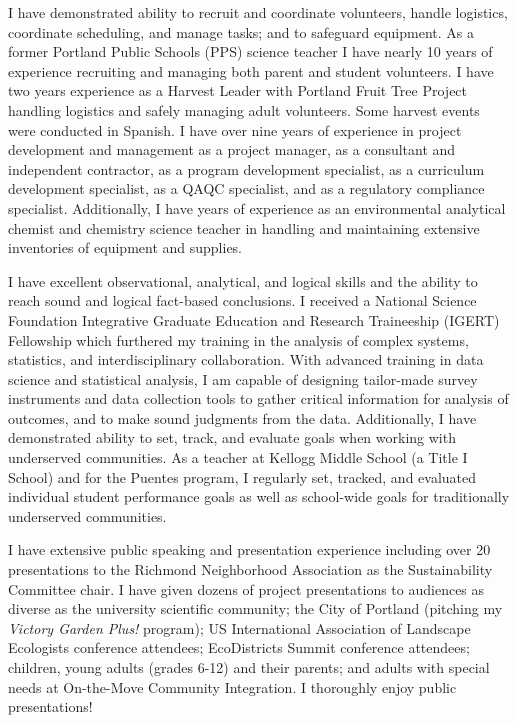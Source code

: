 \documentclass[11 pt,letterpaper]{moderncv}        %
\begin{document}
I have demonstrated ability to recruit and coordinate volunteers, handle logistics, coordinate scheduling, and manage tasks; and to safeguard equipment. As a former Portland Public Schools (PPS) science teacher I have nearly 10 years of experience recruiting and managing both parent and student volunteers. I have two years experience as a Harvest Leader with Portland Fruit Tree Project handling logistics and safely managing adult volunteers. Some harvest events were conducted in Spanish. I have over nine years of experience in project development and management as a project manager, as a consultant and independent contractor, as a program development specialist, as a curriculum development specialist, as a QAQC specialist, and as a regulatory compliance specialist. Additionally, I have years of experience as an environmental analytical chemist and chemistry science teacher in handling and maintaining extensive inventories of equipment and supplies.
 
I have excellent observational, analytical, and logical skills and the ability to reach sound and logical fact-based conclusions. I received a National Science Foundation Integrative Graduate Education and Research Traineeship (IGERT) Fellowship which furthered my training in the analysis of complex systems, statistics, and interdisciplinary collaboration. With advanced training in data science and statistical analysis, I am capable of designing tailor-made survey instruments and data collection tools to gather critical information for analysis of outcomes, and to make sound judgments from the data. Additionally, I have demonstrated ability to set, track, and evaluate goals when working with underserved communities. As a teacher at Kellogg Middle School (a Title I School) and for the Puentes program, I regularly set, tracked, and evaluated individual student performance goals as well as school-wide goals for traditionally underserved communities.

I have extensive public speaking and presentation experience including over 20 presentations to the Richmond Neighborhood Association as the Sustainability Committee chair. I have given dozens of project presentations to audiences as diverse as the university scientific community; the City of Portland (pitching my \textit{Victory Garden Plus!} program); US International Association of Landscape Ecologists conference attendees; EcoDistricts Summit conference attendees; children, young adults (grades 6-12) and their parents; and adults with special needs at On-the-Move Community Integration. I thoroughly enjoy public presentations!
\end{document}
